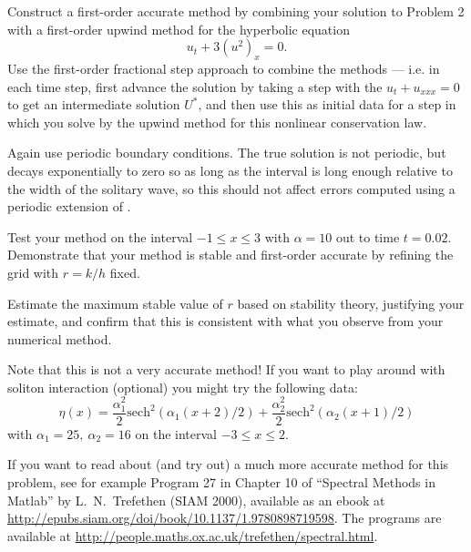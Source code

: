 \documentclass[10pt]{article}
\begin{document}
Construct a first-order accurate method by combining your solution to Problem 2
with a first-order upwind method for the hyperbolic equation
\begin{equation} \label{3b}
u_t + 3(u^2)_x = 0.
\end{equation} 
Use the first-order fractional step approach to combine the methods --- i.e.
in each time step, first advance the solution by taking a step with the $u_t
+ u_{xxx} = 0$ to get an intermediate solution $U^*$, and then use this as
initial data for a step in which you solve  by the upwind method for
this nonlinear conservation law.  

Again use periodic boundary conditions.  The true solution is not periodic,
but decays exponentially to zero so as long as the interval is long enough
relative to the width of the solitary wave, so this should not affect errors
computed using a periodic extension of .

Test your method on the interval $-1 \leq x \leq 3$ with $\alpha=10$ out to
time $t=0.02$.  Demonstrate that your method is stable and first-order
accurate by refining the grid with $r = k/h$ fixed.

Estimate the maximum stable value of $r$ based on stability theory,
justifying your estimate, and confirm that this is consistent with
what you observe from your numerical method.

\vskip 10pt
Note that this is not a very accurate method!  If you want to play around
with soliton interaction (optional) you might try the following data:
\begin{equation} 
\eta(x) = \frac {\alpha_1^2}{2} \text{sech}^2\left(\alpha_1 (x + 2)/2
\right) + \frac {\alpha_2^2}{2} \text{sech}^2\left(\alpha_2 (x + 1)/2\right)
\end{equation} 
with $\alpha_1 = 25, ~\alpha_2= 16$ on the interval $-3\leq x \leq 2$.  

If you want to read about (and try out) a much more accurate method
for this problem, see for example Program 27 in Chapter 10 of
``Spectral Methods in Matlab'' by L.\ N.\ Trefethen (SIAM 2000),
available as an ebook at
\url{http://epubs.siam.org/doi/book/10.1137/1.9780898719598}.
The programs are available at
\url{http://people.maths.ox.ac.uk/trefethen/spectral.html}.




\end{document}

